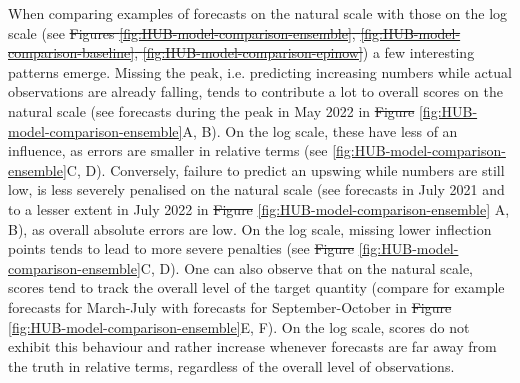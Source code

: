 \documentclass[10pt,letterpaper]{article} %
\providecommand{\DIFaddtex}[1]{{\protect\color{blue}\uwave{#1}}} %
\providecommand{\DIFdeltex}[1]{{\protect\color{red}\sout{#1}}}                      %
\providecommand{\DIFaddbegin}{} %
\providecommand{\DIFaddend}{} %
\providecommand{\DIFdelbegin}{} %
\providecommand{\DIFdelend}{} %
\providecommand{\DIFadd}[1]{\texorpdfstring{\DIFaddtex{#1}}{#1}} %
\providecommand{\DIFdel}[1]{\texorpdfstring{\DIFdeltex{#1}}{}} %
\newcommand{\DIFscaledelfig}{0.5}
\newlength{\DIFdelgraphicswidth} %
\newlength{\DIFdelgraphicsheight} %
\newcommand{\DIFaddincludegraphics}[2][]{{\color{blue}\fbox{\DIFOincludegraphics[#1]{#2}}}} %
\newcommand{\DIFdelincludegraphics}[2][]{%
\sbox{\DIFdelgraphicsbox}{\DIFOincludegraphics[#1]{#2}}%
\settoboxwidth{\DIFdelgraphicswidth}{\DIFdelgraphicsbox} %
\settoboxtotalheight{\DIFdelgraphicsheight}{\DIFdelgraphicsbox} %
\scalebox{\DIFscaledelfig}{%
\parbox[b]{\DIFdelgraphicswidth}{\usebox{\DIFdelgraphicsbox}\\[-\baselineskip] \rule{\DIFdelgraphicswidth}{0em}}\llap{\resizebox{\DIFdelgraphicswidth}{\DIFdelgraphicsheight}{%
\setlength{\unitlength}{\DIFdelgraphicswidth}%
\begin{picture}(1,1)%
\thicklines\linethickness{2pt} %
{\color[rgb]{1,0,0}\put(0,0){\framebox(1,1){}}}%
{\color[rgb]{1,0,0}\put(0,0){\line( 1,1){1}}}%
{\color[rgb]{1,0,0}\put(0,1){\line(1,-1){1}}}%
\end{picture}%
}\hspace*{3pt}}} %
} %
\DeclareRobustCommand{\DIFaddbegin}{\DIFOaddbegin \let\includegraphics\DIFaddincludegraphics} %
\DeclareRobustCommand{\DIFaddend}{\DIFOaddend \let\includegraphics\DIFOincludegraphics} %
\DeclareRobustCommand{\DIFdelbegin}{\DIFOdelbegin \let\includegraphics\DIFdelincludegraphics} %
\DeclareRobustCommand{\DIFdelend}{\DIFOaddend \let\includegraphics\DIFOincludegraphics} %
\begin{document}
When comparing examples of forecasts on the natural scale with those on the log scale (see \DIFdelbegin \DIFdel{Figures \ref{fig:HUB-model-comparison-ensemble}, \ref{fig:HUB-model-comparison-baseline}, \ref{fig:HUB-model-comparison-epinow}}\DIFdelend \DIFaddbegin \DIFadd{Fig \ref{fig:HUB-model-comparison-ensemble}, }\DIFadd{, }\DIFaddend ) a few interesting patterns emerge. Missing the peak, i.e. predicting increasing numbers while actual observations are already falling, tends to contribute a lot to overall scores on the natural scale (see forecasts during the peak in May 2022 in \DIFdelbegin \DIFdel{Figure }\DIFdelend \DIFaddbegin \DIFadd{Fig }\DIFaddend \ref{fig:HUB-model-comparison-ensemble}A, B). On the log scale, these have less of an influence, as errors are smaller in relative terms (see \ref{fig:HUB-model-comparison-ensemble}C, D). Conversely, failure to predict an upswing while numbers are still low, is less severely penalised on the natural scale (see forecasts in July 2021 and to a lesser extent in July 2022 in \DIFdelbegin \DIFdel{Figure }\DIFdelend \DIFaddbegin \DIFadd{Fig }\DIFaddend \ref{fig:HUB-model-comparison-ensemble} A, B), as overall absolute errors are low. On the log scale, missing lower inflection points tends to lead to more severe penalties (see \DIFdelbegin \DIFdel{Figure }\DIFdelend \DIFaddbegin \DIFadd{Fig }\DIFaddend \ref{fig:HUB-model-comparison-ensemble}C, D). One can also observe that on the natural scale, scores tend to track the overall level of the target quantity (compare for example forecasts for March-July with forecasts for September-October in \DIFdelbegin \DIFdel{Figure }\DIFdelend \DIFaddbegin \DIFadd{Fig }\DIFaddend \ref{fig:HUB-model-comparison-ensemble}E, F). On the log scale, scores do not exhibit this behaviour and rather increase whenever forecasts are far away from the truth in relative terms, regardless of the overall level of observations. 
\end{document}
